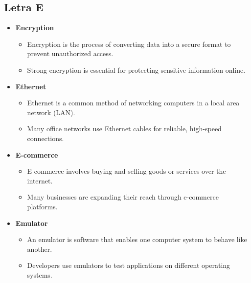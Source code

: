     \subsection{Letra E}
    \begin{itemize}
        \item \textbf{Encryption}
        \begin{itemize}
            \item Encryption is the process of converting data into a secure format to prevent unauthorized access.
            \item Strong encryption is essential for protecting sensitive information online.
        \end{itemize}
        \item \textbf{Ethernet}
        \begin{itemize}
            \item Ethernet is a common method of networking computers in a local area network (LAN).
            \item Many office networks use Ethernet cables for reliable, high-speed connections.
        \end{itemize}
        \item \textbf{E-commerce}
        \begin{itemize}
            \item E-commerce involves buying and selling goods or services over the internet.
            \item Many businesses are expanding their reach through e-commerce platforms.
        \end{itemize}
        \item \textbf{Emulator}
        \begin{itemize}
            \item An emulator is software that enables one computer system to behave like another.
            \item Developers use emulators to test applications on different operating systems.
        \end{itemize}
    \end{itemize}

